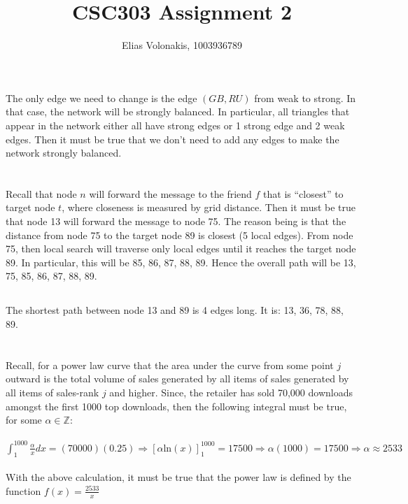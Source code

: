 \documentclass[12pt]{article}
\title{CSC303 Assignment 2}
\author{Elias Volonakis, 1003936789}
\begin{document}
\maketitle

\section{}
The only edge we need to change is the edge $(GB, RU)$ from weak to strong. In that case, the network will be strongly balanced. In particular, all triangles that appear in the network either all have strong edges or 1 strong edge and 2 weak edges. Then it must be true that we don't need to add any edges to make the network strongly balanced. 
\newline 
\newline 


\newpage
\section{}
\subsection{}
Recall that node $n$ will forward the message to the friend $f$ that is “closest” to target node $t$, where closeness is measured by grid distance. Then it must be true that node 13 will forward the message to node 75. The reason being is that the distance from node 75 to the target node 89 is closest (5 local edges). From node 75, then local search will traverse only local edges until it reaches the target node 89. In particular, this will be 85, 86, 87, 88, 89. Hence the overall path will be 13, 75, 85, 86, 87, 88, 89.
\subsection{}
The shortest path between node 13 and 89 is 4 edges long. It is: 13, 36, 78, 88, 89. 

\newpage
\section{}
Recall, for a power law curve that the area under the curve from some point $j$ outward is the total volume of sales generated by all items of sales generated by all items of sales-rank $j$ and higher. Since, the retailer has sold 70,000 downloads amongst the first 1000 top downloads, then the following integral must be true, for some $\alpha \in \mathbb{Z}$:
\\ 
\\
$\int_{1}^{1000} \frac{\alpha}{x} dx = (70000)(0.25) \Rightarrow [\alpha \text{ln}(x)]^{1000}_{1} = 17500 \Rightarrow \alpha(1000) = 17500 \Rightarrow \alpha \approx 2533$
\\ \\
With the above calculation, it must be true that the power law is defined by the function $f(x) = \frac{2533}{x}$
\end{document}
